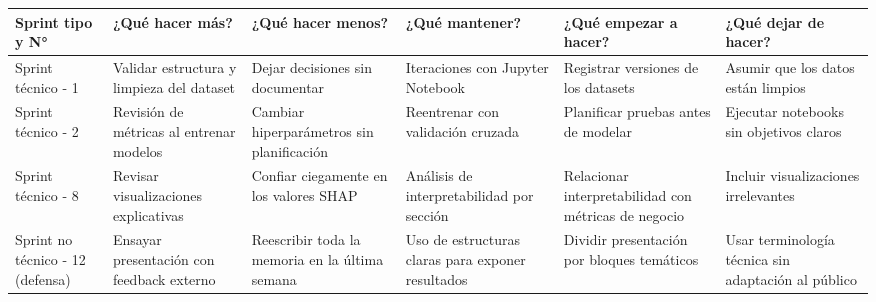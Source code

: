 \documentclass[
11pt, %
]{charter}
\begin{document}
  \begin{table}[htpb]
    \renewcommand{\arraystretch}{1.4}
    \begin{tabular}{|>{\raggedright\arraybackslash}p{1.8cm}|
                    >{\raggedright\arraybackslash}p{2.3cm}|
                    >{\raggedright\arraybackslash}p{2.3cm}|
                    >{\raggedright\arraybackslash}p{2.3cm}|
                    >{\raggedright\arraybackslash}p{2.3cm}|
                    >{\raggedright\arraybackslash}p{2.3cm}|}
    \hline
    \rowcolor[HTML]{CCCCCC} 
    \textbf{Sprint tipo y N°} & \textbf{¿Qué hacer más?} & \textbf{¿Qué hacer menos?} & \textbf{¿Qué mantener?} & \textbf{¿Qué empezar a hacer?} & \textbf{¿Qué dejar de hacer?} \\
    \hline
    Sprint técnico - 1 & Validar estructura y limpieza del dataset & Dejar decisiones sin documentar & Iteraciones con Jupyter Notebook & Registrar versiones de los datasets & Asumir que los datos están limpios \\
    \hline
    Sprint técnico - 2 & Revisión de métricas al entrenar modelos & Cambiar hiperparámetros sin planificación & Reentrenar con validación cruzada & Planificar pruebas antes de modelar & Ejecutar notebooks sin objetivos claros \\
    \hline
    Sprint técnico - 8 & Revisar visualizaciones explicativas & Confiar ciegamente en los valores SHAP & Análisis de interpretabilidad por sección & Relacionar interpretabilidad con métricas de negocio & Incluir visualizaciones irrelevantes \\
    \hline
    Sprint no técnico - 12 (defensa) & Ensayar presentación con feedback externo & Reescribir toda la memoria en la última semana & Uso de estructuras claras para exponer resultados & Dividir presentación por bloques temáticos & Usar terminología técnica sin adaptación al público \\
    \hline
    \end{tabular}
    \end{table}
\end{document}
